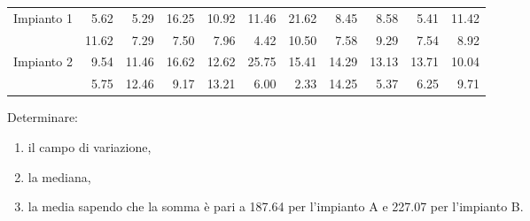 \documentclass[
  11pt,
]{book}
\providecommand{\tightlist}{%
  \setlength{\itemsep}{0pt}\setlength{\parskip}{0pt}}
\theoremstyle{mytheoremstyle}
\theoremstyle{mydefstyle}
\begin{document}
\begin{tabular}{lrrrrrrrrrr}
\toprule
Impianto 1 & 5.62 & 5.29 & 16.25 & 10.92 & 11.46 & 21.62 & 8.45 & 8.58 & 5.41 & 11.42\\
 & 11.62 & 7.29 & 7.50 & 7.96 & 4.42 & 10.50 & 7.58 & 9.29 & 7.54 & 8.92\\
Impianto 2 & 9.54 & 11.46 & 16.62 & 12.62 & 25.75 & 15.41 & 14.29 & 13.13 & 13.71 & 10.04\\
 & 5.75 & 12.46 & 9.17 & 13.21 & 6.00 & 2.33 & 14.25 & 5.37 & 6.25 & 9.71\\
\bottomrule
\end{tabular}

Determinare:

\begin{enumerate}
\def\labelenumi{\alph{enumi}.}
\tightlist
\item
  il campo di variazione,
\item
  la mediana,
\item
  la media sapendo che la somma è pari a 187.64 per l'impianto A e 227.07 per l'impianto B.
\end{enumerate}
\end{document}
